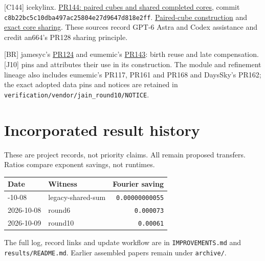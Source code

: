 \documentclass[
  11pt,
]{article}
\newcounter{none} %
\begin{document}
{[}C144{]} icekylinx.
\href{https://github.com/CrocSwap/integer-mult-bounds/pull/144}{PR144:
paired cubes and shared completed cores}, commit
\texttt{c8b22bc5c1\allowbreak{}0dba497ac2\allowbreak{}5804e27d96\allowbreak{}47d818e2ff}.
\href{https://github.com/icekylinx/integer-mult-bounds/blob/c8b22bc5c10dba497ac25804e27d9647d818e2ff/notes/paired-cube-construction.tex}{Paired-cube
construction} and
\href{https://github.com/icekylinx/integer-mult-bounds/blob/c8b22bc5c10dba497ac25804e27d9647d818e2ff/notes/paired-cube-sharing.tex}{exact
core sharing}. These sources record GPT-6 Astra and Codex assistance and
credit an664's PR128 sharing principle.

{[}BR{]} jamesyc's
\href{https://github.com/CrocSwap/integer-mult-bounds/pull/124}{PR124}
and eumemic's
\href{https://github.com/CrocSwap/integer-mult-bounds/pull/143}{PR143}:
birth reuse and late compensation. {[}J10{]} pins and attributes their
use in its construction. The module and refinement lineage also includes
eumemic's PR117, PR161 and PR168 and DaysSky's PR162; the exact adopted
data pins and notices are retained in
\texttt{verification/\allowbreak{}vendor/\allowbreak{}jain\_\allowbreak{}round10/\allowbreak{}NOTICE}.

\section{Incorporated result history}\label{incorporated-result-history}

These are project records, not priority claims. All remain proposed
transfers. Ratios compare exponent savings, not runtimes.

{\def\LTcaptype{none} %
\begin{longtable}[]{@{}llr@{}}
\toprule\noalign{}
Date & Witness & Fourier saving \\
\midrule\noalign{}
\endhead
\bottomrule\noalign{}
\endlastfoot
2026-10-08 & legacy-shared-sum & \texttt{0.00000000055} \\
2026-10-08 & round6 & \texttt{0.000073} \\
2026-10-09 & round10 & \texttt{0.00061} \\
\end{longtable}
}

The full log, record links and update workflow are in
\texttt{IMPROVEMENTS.md} and \texttt{results/\allowbreak{}README.md}. Earlier
assembled papers remain under \texttt{archive/\allowbreak{}}.
\end{document}
